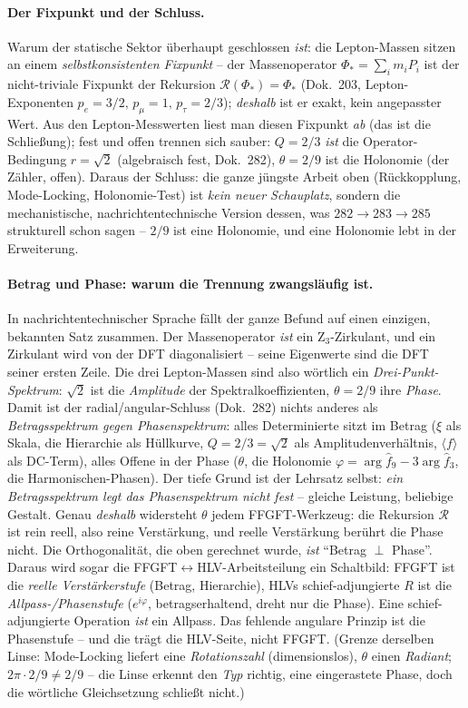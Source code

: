 \paragraph{Der Fixpunkt und der Schluss.} Warum der statische Sektor überhaupt geschlossen \emph{ist}:
die Lepton-Massen sitzen an einem \emph{selbstkonsistenten Fixpunkt} -- der Massenoperator
$\Phi_*=\sum_i m_i P_i$ ist der nicht-triviale Fixpunkt der Rekursion $\mathcal R(\Phi_*)=\Phi_*$
(Dok.~203, Lepton-Exponenten $p_e=3/2,\,p_\mu=1,\,p_\tau=2/3$); \emph{deshalb} ist er exakt, kein
angepasster Wert. Aus den Lepton-Messwerten liest man diesen Fixpunkt \emph{ab} (das ist die
Schließung); fest und offen trennen sich sauber: $Q=2/3$ \emph{ist} die Operator-Bedingung $r=\sqrt2$
(algebraisch fest, Dok.~282), $\theta=2/9$ ist die Holonomie (der Zähler, offen). Daraus der Schluss:
die ganze jüngste Arbeit oben (Rückkopplung, Mode-Locking, Holonomie-Test) ist \emph{kein neuer
Schauplatz}, sondern die mechanistische, nachrichtentechnische Version dessen, was $282\to283\to285$
strukturell schon sagen -- $2/9$ ist eine Holonomie, und eine Holonomie lebt in der Erweiterung.

\paragraph{Betrag und Phase: warum die Trennung zwangsläufig ist.} In nachrichtentechnischer Sprache
fällt der ganze Befund auf einen einzigen, bekannten Satz zusammen. Der Massenoperator \emph{ist} ein
Z$_3$-Zirkulant, und ein Zirkulant wird von der DFT diagonalisiert -- seine Eigenwerte sind die DFT
seiner ersten Zeile. Die drei Lepton-Massen sind also wörtlich ein \emph{Drei-Punkt-Spektrum}: $\sqrt2$
ist die \emph{Amplitude} der Spektralkoeffizienten, $\theta=2/9$ ihre \emph{Phase}. Damit ist der
radial/angular-Schluss (Dok.~282) nichts anderes als \emph{Betragsspektrum gegen Phasenspektrum}: alles
Determinierte sitzt im Betrag ($\xi$ als Skala, die Hierarchie als Hüllkurve, $Q=2/3=\sqrt2$ als
Amplitudenverhältnis, $\langle f\rangle$ als DC-Term), alles Offene in der Phase ($\theta$, die Holonomie
$\varphi=\arg\hat f_9-3\arg\hat f_3$, die Harmonischen-Phasen). Der tiefe Grund ist der Lehrsatz selbst:
\emph{ein Betragsspektrum legt das Phasenspektrum nicht fest} -- gleiche Leistung, beliebige Gestalt.
Genau \emph{deshalb} widersteht $\theta$ jedem FFGFT-Werkzeug: die Rekursion $\mathcal R$ ist rein reell,
also reine Verstärkung, und reelle Verstärkung berührt die Phase nicht. Die Orthogonalität, die oben
gerechnet wurde, \emph{ist} \enquote{Betrag $\perp$ Phase}. Daraus wird sogar die
FFGFT$\leftrightarrow$HLV-Arbeitsteilung ein Schaltbild: FFGFT ist die \emph{reelle Verstärkerstufe}
(Betrag, Hierarchie), HLVs schief-adjungierte $R$ ist die \emph{Allpass-/Phasenstufe} ($e^{i\varphi}$,
betragserhaltend, dreht nur die Phase). Eine schief-adjungierte Operation \emph{ist} ein Allpass. Das
fehlende angulare Prinzip ist die Phasenstufe -- und die trägt die HLV-Seite, nicht FFGFT. (Grenze
derselben Linse: Mode-Locking liefert eine \emph{Rotationszahl} (dimensionslos), $\theta$ einen
\emph{Radiant}; $2\pi\cdot2/9\neq2/9$ -- die Linse erkennt den \emph{Typ} richtig, eine eingerastete
Phase, doch die wörtliche Gleichsetzung schließt nicht.)

